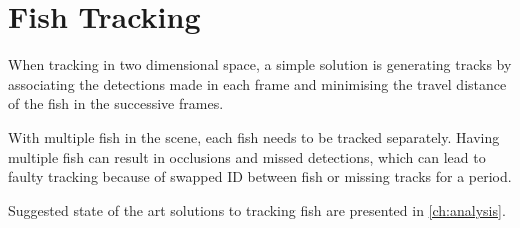 \section{Fish Tracking}
When tracking in two dimensional space, a simple solution is generating tracks by associating the detections made in each frame and minimising the travel distance of the fish in the successive frames.

With multiple fish in the scene, each fish needs to be tracked separately. Having multiple fish can result in occlusions and missed detections, which can lead to faulty tracking because of swapped ID between fish or missing tracks for a period.

Suggested state of the art solutions to tracking fish are presented in \autoref{ch:analysis}.
